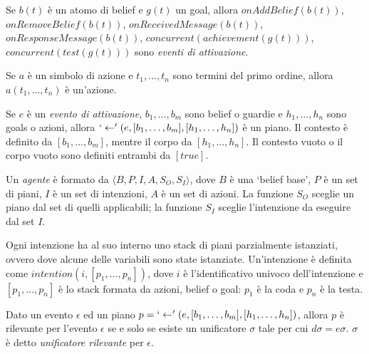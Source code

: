 \smallskip
\begin{defn}\label{defn:triggeringEvents}
Se $b(t)$ è un atomo di belief e $g(t)$ un goal, allora $onAddBelief(b(t))$, $onRemoveBelief(b(t))$, $onReceivedMessage(b(t))$, $onResponseMessage(b(t))$, $concurrent(achievement(g(t)))$, $concurrent(test(g(t)))$ sono \textit{eventi di attivazione}.
\end{defn}

\smallskip
\begin{defn}
Se $a$ è un simbolo di azione e $t_1, \ldots, t_n$ sono termini del primo ordine, allora $a(t_1, \ldots, t_n)$ è un'azione.
\end{defn}

\smallskip
\begin{defn}
Se $e$ è un \textit{evento di attivazione}, $b_1, \ldots, b_m$ sono belief o guardie e $h_1, \ldots, h_n$ sono goals o azioni, allora $`\leftarrow'(e, [b_1, \ldots, b_m], [h_1, \ldots, h_n])$ è un piano.
Il contesto è definito da $[b_1, \ldots, b_m]$, mentre il corpo da $[h_1, \ldots, h_n]$. Il contesto vuoto o il corpo vuoto sono definiti entrambi da $[true]$.
\end{defn}

\smallskip
\begin{defn}
Un \textit{agente} è formato da $\langle B,P,I,A,S_O,S_I \rangle$, dove $B$ è una `belief base', $P$ è un set di piani, $I$ è un set di intenzioni, $A$ è un set di azioni. La funzione $S_O$ sceglie un piano dal set di quelli applicabili; la funzione $S_I$ sceglie l'intenzione da eseguire dal set $I$.
\end{defn}

\smallskip
\begin{defn}\label{defn:intenzione}
Ogni intenzione ha al suo interno uno stack di piani parzialmente istanziati, ovvero dove alcune delle variabili sono state istanziate. Un'intenzione è definita come $intention(i, [p_1, \ldots, p_n])$, dove $i$ è l'identificativo univoco dell'intenzione e $[p_1, \ldots,p_n]$ è lo stack formata da azioni, belief o goal: $p_1$ è la coda e $p_n$ è la testa.
\end{defn}

\smallskip
\begin{defn}
Dato un evento $\epsilon$ ed un piano $p = `\leftarrow'(e, [b_1, \ldots, b_m], [h_1, \ldots, h_n])$, allora $p$ è rilevante per l'evento $\epsilon$ se e solo se esiste un unificatore $\sigma$ tale per cui $d\sigma = e\sigma$. $\sigma$ è detto \textit{unificatore rilevante} per $\epsilon$.
\end{defn}

